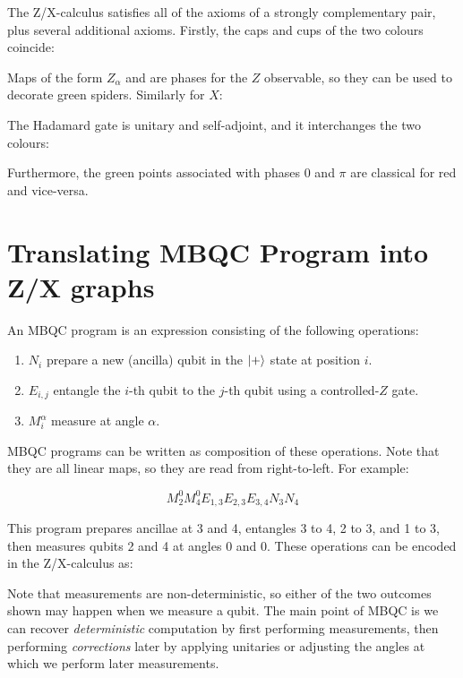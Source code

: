 \documentclass{article}
\begin{document}
The Z/X-calculus satisfies all of the axioms of a strongly complementary pair, plus several additional axioms. Firstly, the caps and cups of the two colours coincide:

Maps of the form $Z_\alpha$ and are phases for the $Z$ observable, so they can be used to decorate green spiders. Similarly for $X$:

The Hadamard gate is unitary and self-adjoint, and it interchanges the two colours:
\begin{center}
  \qquad\qquad
\end{center}

Furthermore, the green points associated with phases $0$ and $\pi$ are classical for red and vice-versa.


\section*{Translating MBQC Program into Z/X graphs}

An MBQC program is an expression consisting of the following operations:

\begin{enumerate}
  \item $N_i$ prepare a new (ancilla) qubit in the $\left| + \right\rangle$ state at position $i$.
  \item $E_{i,j}$ entangle the $i$-th qubit to the $j$-th qubit using a controlled-$Z$ gate.
  \item $M_i^\alpha$ measure at angle $\alpha$.
\end{enumerate}

MBQC programs can be written as composition of these operations. Note that they are all linear maps, so they are read from right-to-left. For example:

\[ M_2^0 M_4^0 E_{1,3} E_{2,3} E_{3,4} N_3 N_4 \]

This program prepares ancillae at 3 and 4, entangles 3 to 4, 2 to 3, and 1 to 3, then measures qubits 2 and 4 at angles 0 and 0. These operations can be encoded in the Z/X-calculus as:

Note that measurements are non-deterministic, so either of the two outcomes shown may happen when we measure a qubit. The main point of MBQC is we can recover \textit{deterministic} computation by first performing measurements, then performing \textit{corrections} later by applying unitaries or adjusting the angles at which we perform later measurements.
\end{document}
